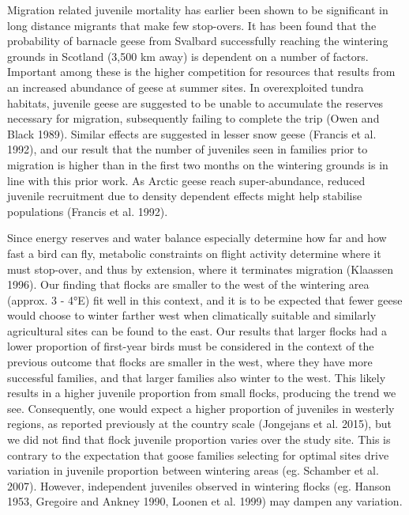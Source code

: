 \documentclass[10pt,twocolumn]{paper}
\begin{document}
Migration related juvenile mortality has earlier been shown to be
significant in long distance migrants that make few stop-overs. It has
been found that the probability of barnacle geese from Svalbard
successfully reaching the wintering grounds in Scotland (3,500 km away)
is dependent on a number of factors. Important among these is the higher
competition for resources that results from an increased abundance of
geese at summer sites. In overexploited tundra habitats, juvenile geese
are suggested to be unable to accumulate the reserves necessary for
migration, subsequently failing to complete the trip (Owen and Black
1989). Similar effects are suggested in lesser snow geese (Francis et
al. 1992), and our result that the number of juveniles seen in families
prior to migration is higher than in the first two months on the
wintering grounds is in line with this prior work. As Arctic geese reach
super-abundance, reduced juvenile recruitment due to density dependent
effects might help stabilise populations (Francis et al. 1992).

Since energy reserves and water balance especially determine how far and
how fast a bird can fly, metabolic constraints on flight activity
determine where it must stop-over, and thus by extension, where it
terminates migration (Klaassen 1996). Our finding that flocks are
smaller to the west of the wintering area (approx. 3 - 4°E) fit well in
this context, and it is to be expected that fewer geese would choose to
winter farther west when climatically suitable and similarly
agricultural sites can be found to the east. Our results that larger
flocks had a lower proportion of first-year birds must be considered in
the context of the previous outcome that flocks are smaller in the west,
where they have more successful families, and that larger families also
winter to the west. This likely results in a higher juvenile proportion
from small flocks, producing the trend we see. Consequently, one would
expect a higher proportion of juveniles in westerly regions, as reported
previously at the country scale (Jongejans et al. 2015), but we did not
find that flock juvenile proportion varies over the study site. This is
contrary to the expectation that goose families selecting for optimal
sites drive variation in juvenile proportion between wintering areas
(eg. Schamber et al. 2007). However, independent juveniles observed in
wintering flocks (eg. Hanson 1953, Gregoire and Ankney 1990, Loonen et
al. 1999) may dampen any variation.
\end{document}
